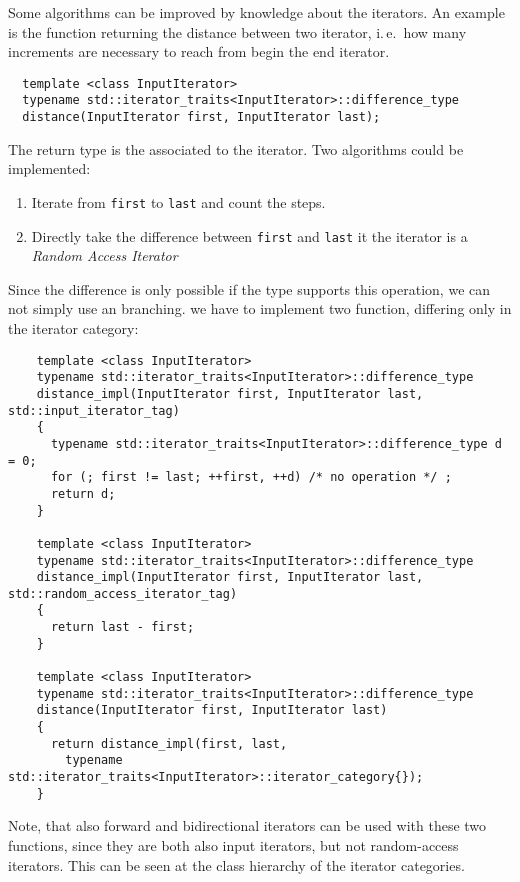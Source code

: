 \begin{example}
  Some algorithms can be improved by knowledge about the iterators. An example is the function  returning the distance
  between two iterator, i.\,e.\ how many increments are necessary to reach from begin the end iterator.
  \begin{verbatim}
  template <class InputIterator>
  typename std::iterator_traits<InputIterator>::difference_type
  distance(InputIterator first, InputIterator last);
  \end{verbatim}

  The return type is the  associated to the iterator. Two algorithms could be implemented:
  \begin{enumerate}
    \item Iterate from \texttt{first} to \texttt{last} and count the steps.
    \item Directly take the difference between \texttt{first} and \texttt{last} it the iterator is a \emph{Random Access Iterator}
  \end{enumerate}

  Since the difference is only possible if the type supports this operation, we can not simply use an  branching. we have
  to implement two function, differing only in the iterator category:
  \newpage
  \begin{verbatim}
    template <class InputIterator>
    typename std::iterator_traits<InputIterator>::difference_type
    distance_impl(InputIterator first, InputIterator last, std::input_iterator_tag)
    {
      typename std::iterator_traits<InputIterator>::difference_type d = 0;
      for (; first != last; ++first, ++d) /* no operation */ ;
      return d;
    }

    template <class InputIterator>
    typename std::iterator_traits<InputIterator>::difference_type
    distance_impl(InputIterator first, InputIterator last, std::random_access_iterator_tag)
    {
      return last - first;
    }

    template <class InputIterator>
    typename std::iterator_traits<InputIterator>::difference_type
    distance(InputIterator first, InputIterator last)
    {
      return distance_impl(first, last,
        typename std::iterator_traits<InputIterator>::iterator_category{});
    }
  \end{verbatim}

  Note, that also forward and bidirectional iterators can be used with these two functions, since they are both
  also input iterators, but not random-access iterators. This can be seen at the class hierarchy of the iterator
  categories.
\end{example}

